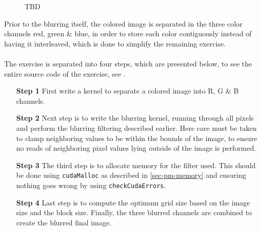 \begin{figure}[ht]
	\centering
	\caption{TBD}
	\label{fig:ex2}
\end{figure}

Prior to the blurring itself, the colored image is separated in the three color channels red, green \& blue, in order to store each color contiguously instead of having it interleaved, which is done to simplify the remaining exercise.
\\\\
The exercise is separated into four steps, which are presented below, to see the entire source code of the exercise, see \cite{exercises}.

\begin{enumerate}
	\item[\textbf{Step 1}] First write a kernel to separate a colored image into R, G \& B channels.

	\item[\textbf{Step 2}] Next step is to write the blurring kernel, running through all pixels and perform the blurring filtering described earlier.
	Here care must be taken to clamp neighboring values to be within the bounds of the image, to ensure no reads of neighboring pixel values lying outside of the image is performed. 
	

	\item[\textbf{Step 3}] The third step is to allocate memory for the filter used.
	This should be done using \texttt{cudaMalloc} as described in \cref{sec-pm-memory} and ensuring nothing goes wrong by using \texttt{checkCudaErrors}.

	\item[\textbf{Step 4}] Last step is to compute the optimum grid size based on the image size and the block size.
	Finally, the three blurred channels are combined to create the blurred final image.
\end{enumerate}

